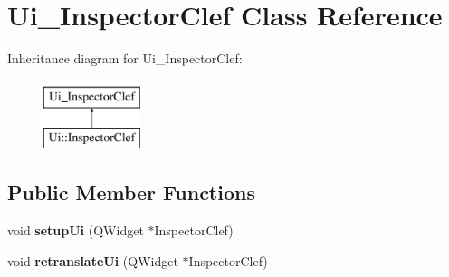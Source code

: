 \hypertarget{class_ui___inspector_clef}{}\section{Ui\+\_\+\+Inspector\+Clef Class Reference}
\label{class_ui___inspector_clef}
Inheritance diagram for Ui\+\_\+\+Inspector\+Clef\+:\begin{figure}[H]
\begin{center}
\leavevmode
\includegraphics[height=2.000000cm]{class_ui___inspector_clef}
\end{center}
\end{figure}
\subsection*{Public Member Functions}
\begin{DoxyCompactItemize}
\item 
\mbox{\label{class_ui___inspector_clef_a3a23916844209f31847d8af3f1b0ebd6}} 
void {\bfseries setup\+Ui} (Q\+Widget $\ast$Inspector\+Clef)
\item 
\mbox{\label{class_ui___inspector_clef_ae220bf411e938d08372b2714cb1fe5b9}} 
void {\bfseries retranslate\+Ui} (Q\+Widget $\ast$Inspector\+Clef)
\end{DoxyCompactItemize}
